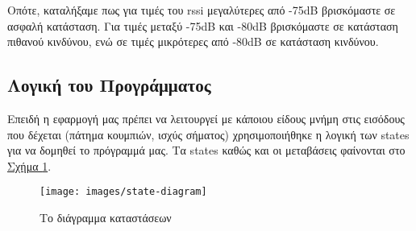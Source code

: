 Οπότε, καταλήξαμε πως για τιμές του rssi μεγαλύτερες από -75dB βρισκόμαστε σε
ασφαλή κατάσταση.
Για τιμές μεταξύ -75dB και -80dB βρισκόμαστε σε κατάσταση πιθανού
κινδύνου, ενώ σε τιμές μικρότερες από -80dB σε κατάσταση κινδύνου.

\subsection{Λογική του Προγράμματος}
Επειδή η εφαρμογή μας πρέπει να λειτουργεί με κάποιου είδους μνήμη στις εισόδους που δέχεται (πάτημα κουμπιών, ισχύς σήματος) χρησιμοποιήθηκε η λογική των states για να δομηθεί το πρόγραμμά μας.
Τα states καθώς και οι μεταβάσεις φαίνονται στο
\renewcommand{\figurename}{Σχήμα}
\hyperref[fig:stdiag]{\figurename{} \ref{fig:stdiag}}.
\begin{figure}[H]
    \centering
    \texttt{[image: images/state-diagram]}
    \caption{Το διάγραμμα καταστάσεων}
    \label{fig:stdiag}
\end{figure}

